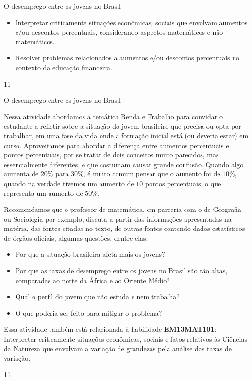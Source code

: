 \clearmargin
\begin{objectives}{O desemprego entre os jovens no Brasil}
{
\begin{itemize}
\item Interpretar criticamente situações econômicas, sociais que envolvam aumentos e/ou descontos percentuais, considerando aspectos matemáticos e não matemáticos.
\item  Resolver problemas relacionados a aumentos e/ou descontos percentuais no contexto da educação financeira.
\end{itemize}
}{1}{1}
\end{objectives}
\begin{sugestions}{O desemprego entre os jovens no Brasil}
{
Nessa atividade abordamos a temática Renda e Trabalho para convidar o estudante a refletir sobre a situação do jovem brasileiro que precisa ou opta por trabalhar, em uma fase da vida onde a formação inicial está (ou deveria estar) em curso. Aproveitamos para abordar a diferença entre aumentos percentuais e pontos percentuais, por se tratar de dois conceitos muito parecidos, mas essencialmente diferentes, e que costumam causar grande confusão. Quando algo aumenta de $20\%$ para $30\%$, é muito comum pensar que o aumento foi de $10\%$, quando na verdade tivemos um aumento de $10$ pontos percentuais, o que representa um aumento de $50\%$. 

Recomendamos que o professor de matemática, em parceria com o de Geografia ou Sociologia por exemplo, discuta a partir das informações apresentadas na matéria, das fontes citadas no texto, de outras fontes contendo dados estatísticos de órgãos oficiais, algumas questões, dentre elas: 

\begin{itemize}
\item Por que a situação brasileira afeta mais os jovens?
\item Por que as taxas de desemprego entre os jovens no Brasil são tão altas, comparadas ao norte da África e ao Oriente Médio?
\item Qual o perfil do jovem que não estuda e nem trabalha?
\item O que poderia ser feito para mitigar o problema? 
\end{itemize}

Essa atividade também está relacionada à habilidade \textbf{EM13MAT101}: Interpretar criticamente situações econômicas, sociais e fatos relativos às Ciências da Natureza que envolvam a variação de grandezas pela análise das taxas de variação. 
}{1}{1}
\end{sugestions}
